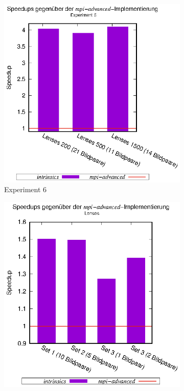 \begin{center}
	\begin{figure}[h]
		\begin{subfigure}[b]{0.54\textwidth}
			\centering
			\includegraphics[width=\textwidth]{pdf/speedups_intrinsics_exp6}
			\caption{Experiment 6}
			\label{fig:speedups_intrinsics_exp6}
		\end{subfigure}
		\hspace{-0.9cm}
		\begin{subfigure}[b]{0.54\textwidth}
			\centering
			\includegraphics[width=\textwidth]{pdf/speedups_intrinsics_lenses}

\end{subfigure}
\end{figure}
\end{center}
